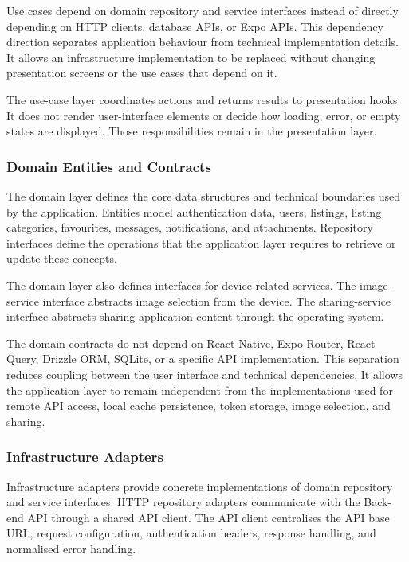 Use cases depend on domain repository and service interfaces instead of directly depending on HTTP clients, database APIs, or Expo APIs.
This dependency direction separates application behaviour from technical implementation details.
It allows an infrastructure implementation to be replaced without changing presentation screens or the use cases that depend on it.

The use-case layer coordinates actions and returns results to presentation hooks.
It does not render user-interface elements or decide how loading, error, or empty states are displayed.
Those responsibilities remain in the presentation layer.

\subsubsection{Domain Entities and Contracts}
\label{sec:c3-domain}

The domain layer defines the core data structures and technical boundaries used by the application.
Entities model authentication data, users, listings, listing categories, favourites, messages, notifications, and attachments.
Repository interfaces define the operations that the application layer requires to retrieve or update these concepts.

The domain layer also defines interfaces for device-related services.
The image-service interface abstracts image selection from the device.
The sharing-service interface abstracts sharing application content through the operating system.

The domain contracts do not depend on React Native, Expo Router, React Query, Drizzle ORM, SQLite, or a specific API implementation.
This separation reduces coupling between the user interface and technical dependencies.
It allows the application layer to remain independent from the implementations used for remote API access, local cache persistence, token storage, image selection, and sharing.

\subsubsection{Infrastructure Adapters}
\label{sec:c3-infrastructure}

Infrastructure adapters provide concrete implementations of domain repository and service interfaces.
HTTP repository adapters communicate with the \tradesq{} Back-end API through a shared API client.
The API client centralises the API base URL, request configuration, authentication headers, response handling, and normalised error handling.

